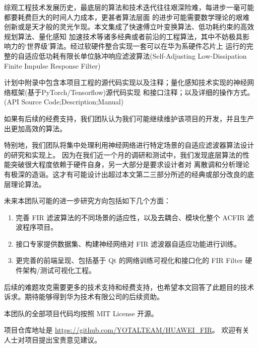 综观工程技术发展历史，最底层的算法和技术迭代往往艰深险难，每进步一毫可能都要耗费巨大的时间人力成本，更甚者算法层面
的进步可能需要数学理论的艰难创新或是天才般的灵光乍现。本文集成了快速傅立叶变换算法、低功耗约束的高效规划算法、量化感知
加速技术等诸多经典或者前沿的工程算法，其中不妨极具影响力的`世界级'算法。经过软硬件整合实现一套可以在华为系硬件芯片上
运行的完整的自适应低功耗有限长单位脉冲响应滤波算法(Self-Adjusting Low-Dissipation Finite Impulse Response Filter)

计划中附录中包含本项目工程的源代码实现以及注释；量化感知技术实现的神经网络框架(基于PyTorch/Tensorflow)源代码实现
和接口注释；以及详细的操作方式。(API Source Code;Description;Manual)

如果有后续的经费支持，我们团队认为我们可能继续维护该项目的开发，并且生产出更加高效的算法。

特别地，我们团队将集中处理利用神经网络进行特定场景的自适应滤波器算法设计的研究和实现上。
因为在我们近一个月的调研和测试中，我们发现底层算法的性能突破很大程度依赖于硬件自身，另一大部分是要求设计者对
离散调和分析理论有极深的造诣。这才有可能设计出超过本文第二三部分所述的经典或部分改良的底层理论算法。

未来本团队可能的进一步研究方向包括如下几个方面：
\begin{enumerate}
    \item 完善 FIR 滤波算法的不同场景的适应性，以及去耦合、模块化整个 ACFIR 滤波程序项目。
    \item 接口专家提供数据集、构建神经网络对 FIR 滤波器自适应功能进行训练。
    \item 更完善的前端呈现、包括基于 Qt 的网络训练可视化和接口化的 FIR Filter 硬件架构/测试可视化工程。
\end{enumerate}

后续的难题攻克需要更多的技术支持和经费支持，也希望本文回答了此题目的技术诉求。期待能够得到华为技术有限公司的后续资助。

本团队的全部项目代码均按照 MIT License 开源。

项目仓库地址是 
\href{https://github.com/YOTALTEAM/HUAWEI_FIR}{https://github.com/YOTALTEAM/HUAWEI\_FIR}。
欢迎有关人士对项目提出宝贵意见建议。